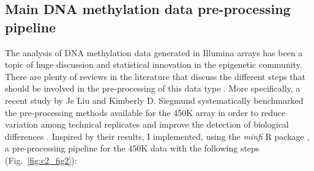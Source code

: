 \smallskip

\subsection{Main DNA methylation data pre-processing pipeline} \label{s:2.1.2}

\smallskip

The analysis of DNA methylation data generated in Illumina arrays has been a topic of huge discussion and statistical innovation in the epigenetic community. There are plenty of reviews in the literature that discuss the different steps that should be involved in the pre-processing of this data type \cite{Wilhelm-Benartzi2013,Morris2015,Liu2016}. More specifically, a recent study by Je Liu and Kimberly D. Siegmund systematically benchmarked the pre-processing methods available for the 450K array in order to reduce variation among technical replicates and improve the detection of biological differences \cite{Liu2016}. Inspired by their results, I implemented, using the \textit{minfi} R package \cite{Aryee2014}, a pre-processing pipeline for the 450K data with the following steps (Fig.~\ref{fig:c2_fig2}):

